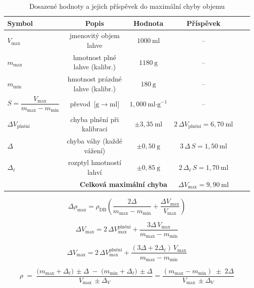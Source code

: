 \begin{table}[h]
\centering
\caption{Dosazené hodnoty a jejich příspěvek do maximální chyby objemu}
\renewcommand{\arraystretch}{1.2}
\begin{tabular}{@{}lccccc@{}}
\toprule
\textbf{Symbol} & \textbf{Popis} & \textbf{Hodnota} & \textbf{Příspěvek}\\
\midrule
$V_{\max}$      & jmenovitý objem lahve           & $1000\ \text{ml}$  & – \\
$m_{\max}$      & hmotnost plné lahve (kalibr.)   & $1180\ \text{g}$   & – \\
$m_{\min}$      & hmotnost prázdné lahve (kalibr.)& $180\ \text{g}$    & – \\
$S=\dfrac{V_{\max}}{m_{\max}-m_{\min}}$
                & převod $\,\bigl[\text{g}\rightarrow\text{ml}\bigr]$
                                                   & $1,000\ \text{ml·g}^{-1}$ & – \\[4pt]
\(\Delta V_{\text{plnění}}\)
                & chyba plnění při kalibraci      & $\pm3,35\ \text{ml}$ &
\(2\,\Delta V_{\text{plnění}} = 6,70\ \text{ml}\) \\

\(\Delta\)      & chyba váhy (každé vážení)       & $\pm0,50\ \text{g}$ &
\(3\,\Delta\,S = 1,50\ \text{ml}\) \\

\(\Delta_{\ell}\)
                & rozptyl hmotností lahví         & $\pm0,85\ \text{g}$ &
\(2\,\Delta_{\ell}\,S = 1,70\ \text{ml}\) \\
\midrule
\multicolumn{3}{r}{\textbf{Celková maximální chyba}} &
\(\boxed{\Delta V_{\text{max}} = 9,90\ \text{ml}}\) \\
\bottomrule
\end{tabular}
\label{tab:worst_case_budget}
\end{table}


\[
\Delta\rho_{\max}= \rho_{\mathrm{DB}}
\left(
   \frac{2\Delta}{m_{\max}-m_{\min}}
  +\frac{\Delta V_{\max}}{V_{\max}}
\right)
\]

\[
\Delta V_{\max}= 2\,\Delta V_{\max}^{\text{plnění}}
               +\frac{3\Delta\,V_{\max}}{m_{\max}-m_{\min}}
\tag{A}
\]


\[
\Delta V_{\max}
  = 2\,\Delta V_{\max}^{\text{plnění}}
  + \frac{(3\Delta + 2\Delta_{\ell})\,V_{\max}}
         {m_{\max}-m_{\min}}
\tag{B}
\]


\begin{equation}
    \rho \;=\;
\frac{\bigl(m_{\max}+\Delta_{\ell}\bigr)\,\pm\Delta
      \;-\;\bigl(m_{\min}+\Delta_{\ell}\bigr)\,\pm\Delta}
     {V_{\max}\,\pm\Delta_V} = \frac{(m_{\max}-m_{\min})\;\pm\;2\Delta}
     {V_{\max}\,\pm\Delta_V}   
     \label{hustotdda}
\end{equation}



